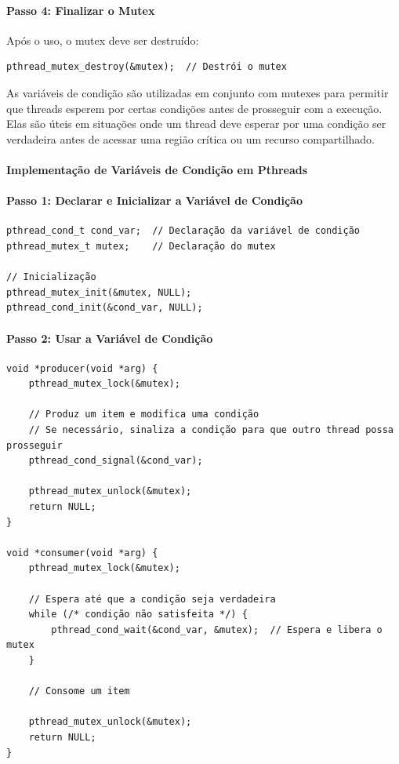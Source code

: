 \documentclass{article}
\begin{document}
\paragraph{Passo 4: Finalizar o Mutex}
Após o uso, o mutex deve ser destruído:
\begin{verbatim}
pthread_mutex_destroy(&mutex);  // Destrói o mutex
\end{verbatim}

As variáveis de condição são utilizadas em conjunto com mutexes para permitir que threads esperem por certas condições antes de prosseguir com a execução. Elas são úteis em situações onde um thread deve esperar por uma condição ser verdadeira antes de acessar uma região crítica ou um recurso compartilhado.

\paragraph{Implementação de Variáveis de Condição em Pthreads}

\paragraph{Passo 1: Declarar e Inicializar a Variável de Condição}
\begin{verbatim}
pthread_cond_t cond_var;  // Declaração da variável de condição
pthread_mutex_t mutex;    // Declaração do mutex

// Inicialização
pthread_mutex_init(&mutex, NULL);
pthread_cond_init(&cond_var, NULL);
\end{verbatim}

\paragraph{Passo 2: Usar a Variável de Condição}
\begin{verbatim}
void *producer(void *arg) {
    pthread_mutex_lock(&mutex);
    
    // Produz um item e modifica uma condição
    // Se necessário, sinaliza a condição para que outro thread possa prosseguir
    pthread_cond_signal(&cond_var);
    
    pthread_mutex_unlock(&mutex);
    return NULL;
}

void *consumer(void *arg) {
    pthread_mutex_lock(&mutex);
    
    // Espera até que a condição seja verdadeira
    while (/* condição não satisfeita */) {
        pthread_cond_wait(&cond_var, &mutex);  // Espera e libera o mutex
    }

    // Consome um item

    pthread_mutex_unlock(&mutex);
    return NULL;
}
\end{verbatim}
\end{document}
